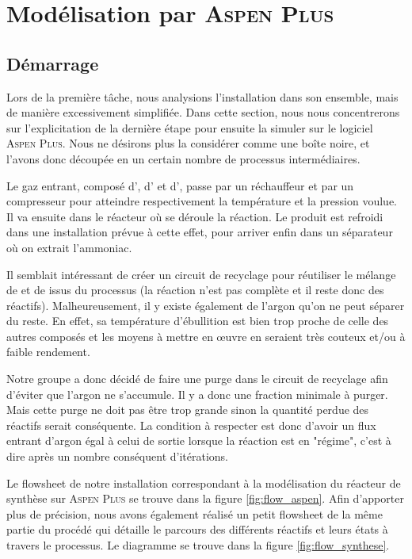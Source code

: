 \section{Modélisation par \textsc{Aspen Plus}}
\subsection{Démarrage}

Lors de la première tâche, nous analysions l'installation dans son ensemble, 
mais de manière excessivement simplifiée. 
Dans cette section, nous nous concentrerons sur l'explicitation de la dernière étape 
pour ensuite la simuler sur le logiciel \textsc{Aspen Plus}. 
Nous ne désirons plus la considérer comme une boîte noire, et l'avons donc découpée 
en un certain nombre de processus intermédiaires. 

Le gaz entrant, composé d', d' et d', passe par un réchauffeur 
et par un compresseur pour atteindre respectivement la température et la pression voulue. 
Il va ensuite dans le réacteur où se déroule la réaction.
Le produit est refroidi dans une installation prévue à cette effet, 
pour arriver enfin dans un séparateur où on extrait l'ammoniac.

Il semblait intéressant de créer un circuit de recyclage pour réutiliser 
le mélange de  et de  issus du processus (la réaction n'est pas complète 
et il reste donc des réactifs). Malheureusement, il y existe également de l'argon 
qu'on ne peut séparer du reste. En effet, sa température d'ébullition est bien trop 
proche de celle des autres composés et les moyens à mettre en œuvre en seraient 
très couteux et/ou à faible rendement.

Notre groupe a donc décidé de faire une purge dans le circuit de recyclage afin d'éviter que l'argon ne s'accumule. Il y a donc une fraction minimale à purger. Mais cette purge ne doit pas être trop grande sinon la quantité perdue des réactifs serait conséquente. 
La condition à respecter est donc d'avoir un flux entrant d'argon égal à celui de sortie lorsque la réaction est en "régime", c'est à dire après un nombre conséquent d'itérations.

Le flowsheet de notre installation correspondant à la modélisation 
du réacteur de synthèse sur \textsc{Aspen Plus} 
se trouve dans la figure \ref{fig:flow_aspen}.
Afin d'apporter plus de précision, nous avons également réalisé un petit 
flowsheet de la même partie du procédé qui détaille le parcours des 
différents réactifs et leurs états à travers le processus.
Le diagramme se trouve dans la figure \ref{fig:flow_synthese}.

